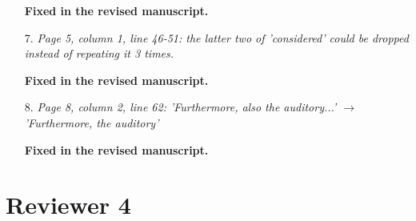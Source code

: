 \documentclass[10pt, a4paper]{article}
\begin{document}
\begin{itemize}
{\textbf{Fixed in the revised manuscript.}}

\item[7.] {\textit{ Page 5, column 1, line 46-51: the latter two of 'considered' could be dropped instead of repeating it 3 times.}}

{\textbf{Fixed in the revised manuscript.}}

\item[8.] {\textit{Page 8, column 2, line 62: 'Furthermore, also the auditory...' $\rightarrow$  'Furthermore, the auditory'}}

{\textbf{Fixed in the revised manuscript.}}

\end{itemize}

\section{Reviewer 4}
\end{document}
